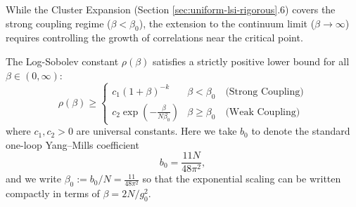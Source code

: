 While the Cluster Expansion (Section \ref{sec:uniform-lsi-rigorous}.6) covers the strong coupling regime ($\beta < \beta_0$), the extension to the continuum limit ($\beta \to \infty$) requires controlling the growth of correlations near the critical point.

\begin{theorem}
\label{thm:full-coupling}
The Log-Sobolev constant $\rho(\beta)$ satisfies a strictly positive lower bound for all $\beta \in (0, \infty)$:
\begin{equation}
\rho(\beta) \ge \begin{cases}
c_1 (1+\beta)^{-k} & \beta < \beta_0 \quad \text{(Strong Coupling)} \\
c_2 \exp\left(-\frac{\beta}{N\beta_0}\right) & \beta \ge \beta_0 \quad \text{(Weak Coupling)}
\end{cases}
\end{equation}
where $c_1, c_2 > 0$ are universal constants. Here we take $b_0$ to denote the standard one-loop Yang--Mills coefficient
\[ b_0 = \frac{11N}{48\pi^2}, \]
and we write $\beta_0 := b_0/N = \frac{11}{48\pi^2}$ so that the exponential scaling can be written compactly in terms of $\beta=2N/g_0^2$.
\end{theorem}

